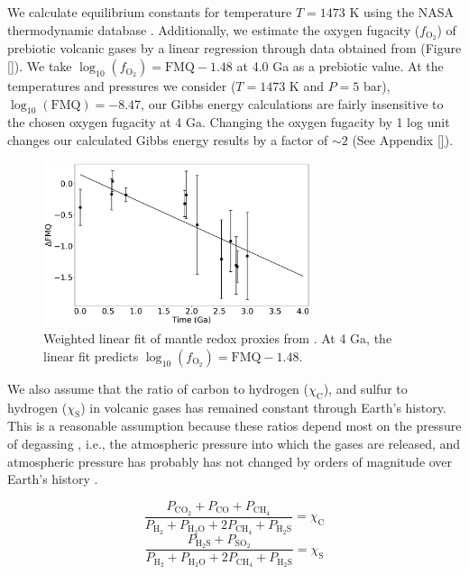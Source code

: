 We calculate equilibrium constants for temperature $T = 1473$ K using the NASA thermodynamic database \citep{Burcat_2005}. Additionally, we estimate the oxygen fugacity ($f_\mathrm{O_2}$) of prebiotic volcanic gases by a linear regression through data obtained from \citet{Aulbach_2016} 
(Figure \ref{}). %
We take $\log_{10}\left(f_\mathrm{O_2}\right) = \mathrm{FMQ} - 1.48$ at 4.0 Ga as a prebiotic value. At the temperatures and pressures we consider ($T = 1473$ K and  $P = 5$ bar), $\log_{10}\left(\mathrm{FMQ}\right) = -8.47$, our Gibbs energy calculations are fairly insensitive to the chosen oxygen fugacity at 4 Ga. Changing the oxygen fugacity by 1 log unit changes our calculated Gibbs energy results by a factor of $\sim 2$ 
(See Appendix \ref{}). %

\begin{figure}
  \centering
  \includegraphics[width=0.7\textwidth]{tex/2diseq/Figure5.pdf}
  \caption{Weighted linear fit of mantle redox proxies from \citet{Aulbach_2016}. At 4 Ga, the linear fit predicts $\log_{10}\left(f_\mathrm{O_2}\right) = \mathrm{FMQ} - 1.48$.}
  \label{fig:diseq_figure5}
\end{figure}

We also assume that the ratio of carbon to hydrogen ($\chi_\mathrm{C}$), and sulfur to hydrogen ($\chi_\mathrm{S}$) in volcanic gases has remained constant through Earth's history. This is a reasonable assumption because these ratios depend most on the pressure of degassing \citep{Gaillard_2014}, i.e., the atmospheric pressure into which the gases are released, and atmospheric pressure has probably has not changed by orders of magnitude over Earth's history \citep{Som_2012}. 

\begin{equation}
  \frac{P_\mathrm{CO_2} + P_\mathrm{CO} + P_\mathrm{CH_4}}{P_\mathrm{H_2} + P_\mathrm{H_2O} + 2 P_\mathrm{CH_4} + P_\mathrm{H_2S}} = \chi_\mathrm{C}
\end{equation}
\begin{equation}
  \label{eq:chi_sulfur}
  \frac{P_\mathrm{H_2S} + P_\mathrm{SO_2}}{P_\mathrm{H_2} + P_\mathrm{H_2O} + 2 P_\mathrm{CH_4} + P_\mathrm{H_2S}} = \chi_\mathrm{S}
\end{equation}

